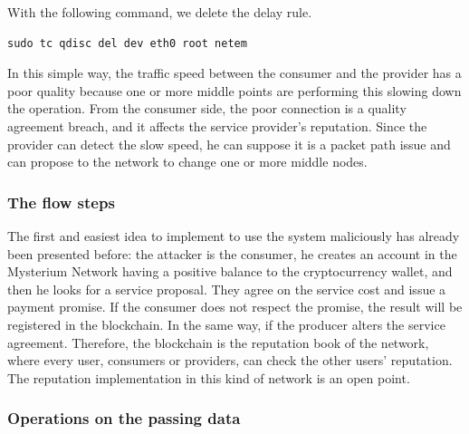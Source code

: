 \documentclass[12pt]{article}
\begin{document}
	With the following command, we delete the delay rule.\\

	\begin{lstlisting}[frame=single]
		sudo tc qdisc del dev eth0 root netem
	\end{lstlisting}

	In this simple way, the traffic speed between the consumer and the provider has a poor quality because one or more middle points are performing this slowing down the operation. From the consumer side, the poor connection is a quality agreement breach, and it affects the service provider's reputation. Since the provider can detect the slow speed, he can suppose it is a packet path issue and can propose to the network to change one or more middle nodes. 

	\subsubsection{The flow steps}
	The first and easiest idea to implement to use the system maliciously has already been presented before: the attacker is the consumer, he creates an account in the Mysterium Network having a positive balance to the cryptocurrency wallet, and then he looks for a service proposal. They agree on the service cost and issue a payment promise. If the consumer does not respect the promise, the result will be registered in the blockchain. In the same way, if the producer alters the service agreement. Therefore, the blockchain is the reputation book of the network, where every user, consumers or providers, can check the other users' reputation. The reputation implementation in this kind of network is an open point.
	
	\subsubsection{Operations on the passing data}
\end{document}
